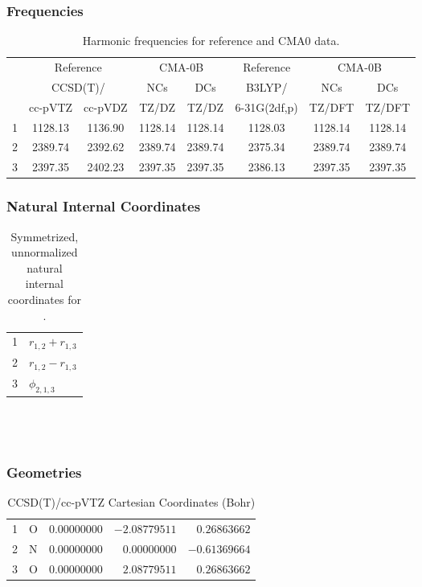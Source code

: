 \documentclass[10pt,oneside]{article}
\begin{document}
\subsubsection*{Frequencies}
\begin{table}[h!]
\centering
\caption{Harmonic frequencies for reference and CMA0 data.}
\begin{tabular}{cccccccc}
\toprule
{} & \multicolumn{2}{c}{Reference} & \multicolumn{2}{c}{CMA-0B} &    Reference & \multicolumn{2}{c}{CMA-0B} \\
{} & \multicolumn{2}{c}{CCSD(T)/} &     NCs &     DCs &       B3LYP/ &     NCs &     DCs \\
{} &   cc-pVTZ & cc-pVDZ &   TZ/DZ &   TZ/DZ & 6-31G(2df,p) &  TZ/DFT &  TZ/DFT \\
\midrule
1 &   1128.13 & 1136.90 & 1128.14 & 1128.14 &      1128.03 & 1128.14 & 1128.14 \\
2 &   2389.74 & 2392.62 & 2389.74 & 2389.74 &      2375.34 & 2389.74 & 2389.74 \\
3 &   2397.35 & 2402.23 & 2397.35 & 2397.35 &      2386.13 & 2397.35 & 2397.35 \\
\bottomrule
\end{tabular}
\end{table}

\clearpage

\subsubsection*{Natural Internal Coordinates}
\begin{table}[h!]
\centering
\caption{Symmetrized, unnormalized natural internal coordinates for .}
\small
\begin{tabular}{ll}
  1   & $r_{1,2} + r_{1,3}$ \\
  2   & $r_{1,2} - r_{1,3}$ \\
  3   & $\phi_{2,1,3}$ \\
\end{tabular}
\end{table}

\clearpage

\subsection{\ \ \ }

\subsubsection*{Geometries}
\begin{table}[h!]
\centering
\caption{CCSD(T)/cc-pVTZ Cartesian Coordinates (Bohr)}
\begin{tabular}{llrrr}
1  & O  & $ 0.00000000$ & $-2.08779511$ & $ 0.26863662$ \\
2  & N  & $ 0.00000000$ & $ 0.00000000$ & $-0.61369664$ \\
3  & O  & $ 0.00000000$ & $ 2.08779511$ & $ 0.26863662$ \\
\end{tabular}
\end{table}
\end{document}
